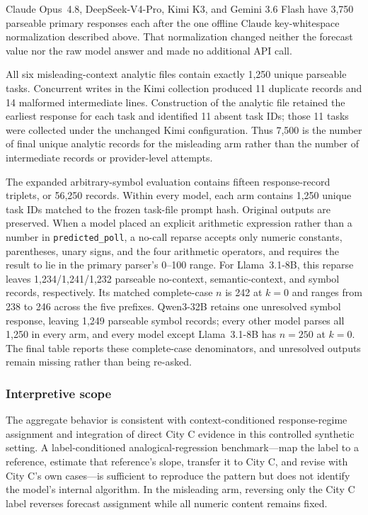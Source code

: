 Claude Opus~4.8, DeepSeek-V4-Pro, Kimi K3, and Gemini 3.6 Flash have 3,750
parseable primary responses each after the one offline Claude key-whitespace
normalization described above. That normalization changed neither the forecast
value nor the raw model answer and made no additional API call.

All six misleading-context analytic files contain exactly 1,250 unique parseable
tasks. Concurrent writes in the Kimi collection produced 11 duplicate records and
14 malformed intermediate lines. Construction of the analytic file retained the
earliest response for each task and identified 11 absent task IDs; those 11 tasks
were collected under the unchanged Kimi configuration. Thus 7,500 is the number
of final unique analytic records for the misleading arm rather than the number of
intermediate records or provider-level attempts.

The expanded arbitrary-symbol evaluation contains fifteen response-record
triplets, or 56,250 records. Within every model, each arm contains 1,250
unique task IDs matched to the frozen task-file prompt hash. Original outputs are
preserved. When a model placed an explicit arithmetic expression rather than a
number in \texttt{predicted\_poll}, a no-call reparse accepts only numeric constants,
parentheses, unary signs, and the four arithmetic operators, and requires
the result to lie in the primary parser's 0--100 range. For Llama~3.1-8B, this
reparse leaves 1,234/1,241/1,232 parseable no-context, semantic-context, and
symbol records, respectively. Its matched complete-case $n$ is 242 at $k=0$ and
ranges from 238 to 246 across the five prefixes. Qwen3-32B retains one
unresolved symbol response, leaving 1,249 parseable symbol records; every other
model parses all 1,250 in every arm, and every model except Llama~3.1-8B has
$n=250$ at $k=0$. The final table reports these complete-case denominators, and unresolved
outputs remain missing rather than being re-asked.

\subsubsection{Interpretive scope}
The aggregate behavior is consistent with context-conditioned response-regime
assignment and integration of direct City C evidence in this controlled synthetic
setting. A label-conditioned analogical-regression benchmark---map the label to a
reference, estimate that reference's slope, transfer it to City C, and revise
with City C's own cases---is sufficient to reproduce the pattern but does not
identify the model's internal algorithm. In the misleading arm, reversing only
the City C label reverses forecast assignment while all numeric content remains
fixed.

